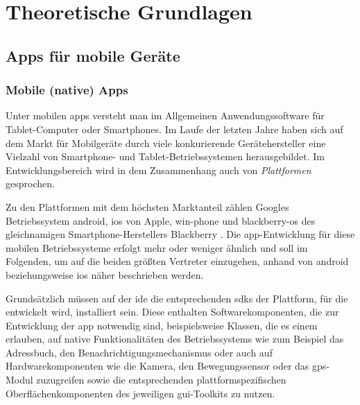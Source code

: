 \chapter{Theoretische Grundlagen}

\section{Apps für mobile Geräte}

\subsection{Mobile (native) Apps} \label{native}
Unter mobilen \glspl{app} versteht man im Allgemeinen Anwendungssoftware für Tablet-Computer oder Smartphones. 
Im Laufe der letzten Jahre haben sich auf dem Markt für Mobilgeräte durch viele konkurierende Gerätehersteller eine Vielzahl von Smartphone- und Tablet-Betriebssystemen herausgebildet.
Im Entwicklungsbereich wird in dem Zusammenhang auch von \emph{Plattformen} gesprochen.

Zu den Plattformen mit dem höchsten Marktanteil zählen Googles Betriebssystem \gls{android}, \gls{ios} von Apple, \gls{win-phone} und \gls{blackberry-os} des gleichnamigen Smartphone-Herstellers Blackberry \cite{platforms-marketshare}.
Die \gls{app}-Entwicklung für diese mobilen Betriebssysteme erfolgt mehr oder weniger ähnlich und soll im Folgenden, um auf die beiden größten Vertreter einzugehen, anhand von \gls{android} beziehungsweise \gls{ios} näher beschrieben werden.

Grundsätzlich müssen auf der \gls{ide} die entsprechenden \glspl{sdk} der Plattform, für die entwickelt wird, installiert sein. 
Diese enthalten Softwarekomponenten, die zur Entwicklung der \gls{app} notwendig sind, beispielsweise Klassen, die es einem erlauben, auf native Funktionalitäten des Betriebssystems wie zum Beispiel das Adressbuch, den Benachrichtigungsmechanismus oder auch auf Hardwarekomponenten wie die Kamera, den Bewegungssensor oder das \gls*{gps}-Modul zuzugreifen sowie die entsprechenden plattformspezifischen Oberflächenkomponenten des jeweiligen \gls*{gui}-Toolkits zu nutzen.

